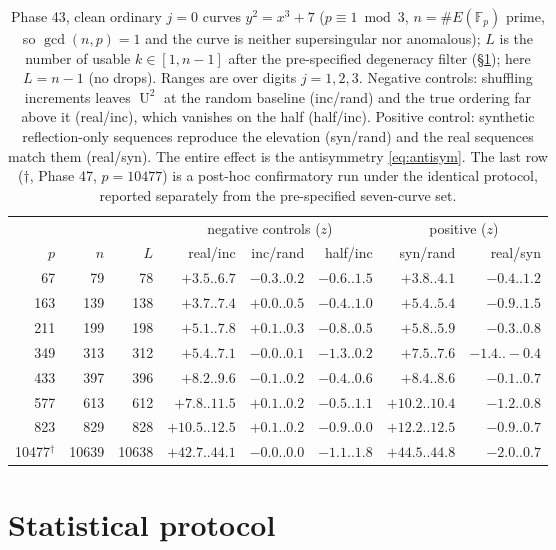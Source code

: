 \documentclass[11pt]{article}
\theoremstyle{definition}
\newcommand{\Fp}{\mathbb{F}_p}
\DeclareMathOperator{\Uk}{U}
\begin{document}
\begin{table}[t]
\centering
\small
\begin{tabular}{rrrrrrrr}
\toprule
& & & \multicolumn{3}{c}{negative controls ($z$)} & \multicolumn{2}{c}{positive ($z$)}\\
\cmidrule(lr){4-6}\cmidrule(lr){7-8}
$p$ & $n$ & $L$ & real/inc & inc/rand & half/inc & syn/rand & real/syn\\
\midrule
 67 &  79 &  78 & $+3.5..6.7$  & $-0.3..0.2$ & $-0.6..1.5$ & $+3.8..4.1$  & $-0.4..1.2$\\
163 & 139 & 138 & $+3.7..7.4$  & $+0.0..0.5$ & $-0.4..1.0$ & $+5.4..5.4$  & $-0.9..1.5$\\
211 & 199 & 198 & $+5.1..7.8$  & $+0.1..0.3$ & $-0.8..0.5$ & $+5.8..5.9$  & $-0.3..0.8$\\
349 & 313 & 312 & $+5.4..7.1$  & $-0.0..0.1$ & $-1.3..0.2$ & $+7.5..7.6$  & $-1.4..-0.4$\\
433 & 397 & 396 & $+8.2..9.6$  & $-0.1..0.2$ & $-0.4..0.6$ & $+8.4..8.6$  & $-0.1..0.7$\\
577 & 613 & 612 & $+7.8..11.5$ & $+0.1..0.2$ & $-0.5..1.1$ & $+10.2..10.4$& $-1.2..0.8$\\
823 & 829 & 828 & $+10.5..12.5$& $+0.1..0.2$ & $-0.9..0.0$ & $+12.2..12.5$& $-0.9..0.7$\\
\midrule
10477$^\dagger$ & 10639 & 10638 & $+42.7..44.1$ & $-0.0..0.0$ & $-1.1..1.8$ & $+44.5..44.8$ & $-2.0..0.7$\\
\bottomrule
\end{tabular}
\caption{Phase 43, clean ordinary $j{=}0$ curves $y^2=x^3+7$
($p\equiv 1\bmod 3$, $n=\#E(\Fp)$ prime, so $\gcd(n,p)=1$ and the curve
is neither supersingular nor anomalous); $L$ is the number of usable
$k\in[1,n-1]$ after the pre-specified degeneracy filter
(\S\ref{sec:stats}); here $L=n-1$ (no drops). Ranges are over digits
$j=1,2,3$. Negative controls: shuffling increments leaves $\Uk^2$ at the
random baseline (inc/rand) and the true ordering far above it (real/inc),
which vanishes on the half (half/inc). Positive control: synthetic
reflection-only sequences reproduce the elevation (syn/rand) and the real
sequences match them (real/syn). The entire effect is the antisymmetry
\eqref{eq:antisym}. The last row ($\dagger$, Phase 47, $p=10477$) is a
post-hoc confirmatory run under the identical protocol, reported
separately from the pre-specified seven-curve set.}
\label{tab:p43}
\end{table}

\section{Statistical protocol}\label{sec:stats}
\end{document}

